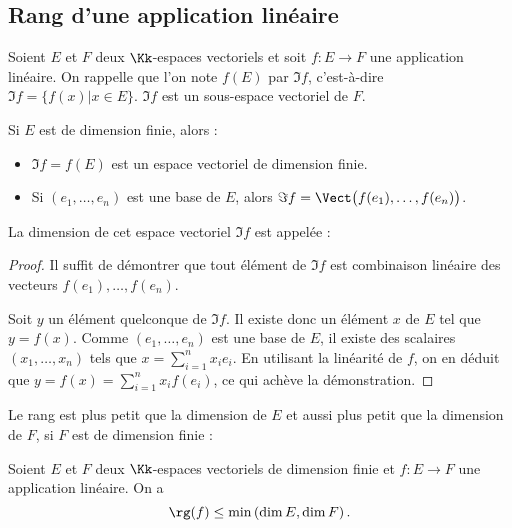 \documentclass[class=report,crop=false]{standalone}
\begin{document}
\subsection{Rang d'une application linéaire}

Soient $E$ et $F$ deux $\Kk$-espaces vectoriels et soit
$f : E \to F$ une application linéaire. On rappelle que l'on note
$f(E)$ par $\Im f$, c'est-à-dire $\Im f = \big\{ f(x) | x \in E \big\}$.
$\Im f$ est un sous-espace vectoriel de $F$.

\begin{proposition}
Si $E$ est de dimension finie, alors :
\begin{itemize}
  \item $\Im f = f(E)$ est un espace vectoriel de dimension finie.
  \item Si $(e_1,\ldots,e_n)$ est une base de $E$, alors
  $\Im f = \Vect \big( f(e_1),\ldots,f(e_n) \big)$.
\end{itemize}
La dimension de cet espace vectoriel $\Im f$ est appelée  :
\end{proposition}


\begin{proof}
Il suffit de démontrer que tout élément de $\Im f$
est combinaison linéaire des vecteurs $f(e_1), \dots ,f(e_n)$.


Soit $y$ un élément quelconque de $\Im f$.
Il existe donc un élément $x$ de $E$ tel que $y=f(x)$.
Comme $(e_1, \dots ,e_n)$ est une base de $E$,
il existe des scalaires $(x_1, \dots ,x_n )$
tels que $x=\displaystyle \sum_{i=1}^n x_i e_i$.
En utilisant la linéarité de $f$, on en déduit que
$y=f(x)=\displaystyle \sum_{i=1}^n x_i f(e_i)$,
ce qui achève la démonstration.
\end{proof}


Le rang est plus petit que la dimension de $E$ et aussi plus petit
que la dimension de $F$, si $F$ est de dimension finie :
\begin{proposition}
Soient $E$ et $F$ deux $\Kk$-espaces vectoriels de dimension finie
et $f : E \to F$ une application linéaire.
On a
$$\rg(f) \le \min \left ( \dim E, \dim F \right).$$
\end{proposition}
\end{document}
